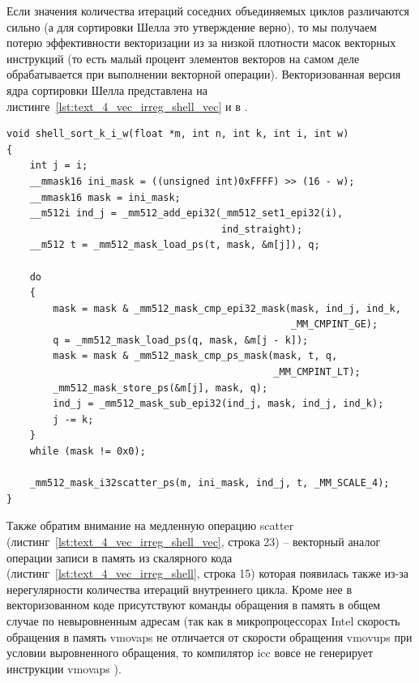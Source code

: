 Если значения количества итераций соседних объединяемых циклов различаются сильно (а для сортировки Шелла это утверждение верно), то мы получаем потерю эффективности векторизации из за низкой плотности масок векторных инструкций (то есть малый процент элементов векторов на самом деле обрабатывается при выполнении векторной операции).
Векторизованная версия ядра сортировки Шелла представлена на листинге~\ref{lst:text_4_vec_irreg_shell_vec} и в \cite{iparGithub}.

\begin{lstlisting}[caption={Векторизованный вариант ядра сортировки Шелла.},label={lst:text_4_vec_irreg_shell_vec}]
void shell_sort_k_i_w(float *m, int n, int k, int i, int w)
{
    int j = i;
    __mmask16 ini_mask = ((unsigned int)0xFFFF) >> (16 - w);
    __mmask16 mask = ini_mask;
    __m512i ind_j = _mm512_add_epi32(_mm512_set1_epi32(i),
                                     ind_straight);
    __m512 t = _mm512_mask_load_ps(t, mask, &m[j]), q;

    do
    {
        mask = mask & _mm512_mask_cmp_epi32_mask(mask, ind_j, ind_k,
                                                 _MM_CMPINT_GE);
        q = _mm512_mask_load_ps(q, mask, &m[j - k]);
        mask = mask & _mm512_mask_cmp_ps_mask(mask, t, q,
                                              _MM_CMPINT_LT);
        _mm512_mask_store_ps(&m[j], mask, q);
        ind_j = _mm512_mask_sub_epi32(ind_j, mask, ind_j, ind_k);
        j -= k;
    }
    while (mask != 0x0);

    _mm512_mask_i32scatter_ps(m, ini_mask, ind_j, t, _MM_SCALE_4);
}
\end{lstlisting}

Также обратим внимание на медленную операцию scatter (листинг~\ref{lst:text_4_vec_irreg_shell_vec}, строка 23) -- векторный аналог операции записи в память из скалярного кода (листинг~\ref{lst:text_4_vec_irreg_shell}, строка 15) которая появилась также из-за нерегулярности количества итераций внутреннего цикла.
Кроме нее в векторизованном коде присутствуют команды обращения в память в общем случае по невыровненным адресам (так как в микропроцессорах Intel скорость обращения в память vmovaps не отличается от скорости обращения vmovups при условии выровненного обращения, то компилятор icc вовсе не генерирует инструкции vmovaps \cite{MOVUPSintel}).

